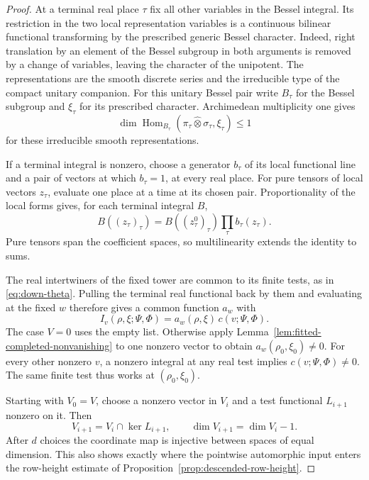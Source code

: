\begin{proof}
At a terminal real place \(\tau\) fix all other variables in the Bessel integral. Its restriction in the two local representation variables is a continuous bilinear functional transforming by the prescribed generic Bessel character. Indeed, right translation by an element of the Bessel subgroup in both arguments is removed by a change of variables, leaving the character of the unipotent. The representations are the smooth discrete series and the irreducible type of the compact unitary companion. For this unitary Bessel pair write \(B_\tau\) for the Bessel subgroup and \(\xi_\tau\) for its prescribed character. Archimedean multiplicity one gives
\[
 \dim\operatorname{Hom}_{B_\tau}(\pi_\tau\widehat\otimes\sigma_\tau,\xi_\tau)\le 1
\]
for these irreducible smooth representations. \cite[Theorem~A]{jiang-sun-zhu-bessel}

If a terminal integral is nonzero, choose a generator \(b_\tau\) of its local functional line and a pair of vectors at which \(b_\tau=1\), at every real place. For pure tensors of local vectors \(z_\tau\), evaluate one place at a time at its chosen pair. Proportionality of the local forms gives, for each terminal integral \(B\),
\[
 B((z_\tau)_\tau)=B((z_\tau^0)_\tau)\prod_\tau b_\tau(z_\tau).
\]
Pure tensors span the coefficient spaces, so multilinearity extends the identity to sums.

 The real intertwiners of the fixed tower are common to its finite tests, as in \eqref{eq:down-theta}. Pulling the terminal real functional back by them and evaluating at the fixed \(w\) therefore gives a common function \(a_w\) with
\[
   I_v(\rho,\xi;\Psi,\Phi)=a_w(\rho,\xi)\,c(v;\Psi,\Phi).
\]
The case \(V=0\) uses the empty list. Otherwise apply Lemma~\ref{lem:fitted-completed-nonvanishing} to one nonzero vector to obtain \(a_w(\rho_0,\xi_0)\ne0\). For every other nonzero \(v\), a nonzero integral at any real test implies \(c(v;\Psi,\Phi)\ne0\). The same finite test thus works at \((\rho_0,\xi_0)\).

Starting with \(V_0=V\), choose a nonzero vector in \(V_i\) and a test functional \(L_{i+1}\) nonzero on it. Then
\[
 V_{i+1}=V_i\cap\ker L_{i+1},\qquad \dim V_{i+1}=\dim V_i-1 .
\]
After \(d\) choices the coordinate map is injective between spaces of equal dimension. This also shows exactly where the pointwise automorphic input enters the row-height estimate of Proposition~\ref{prop:descended-row-height}.
\end{proof}

